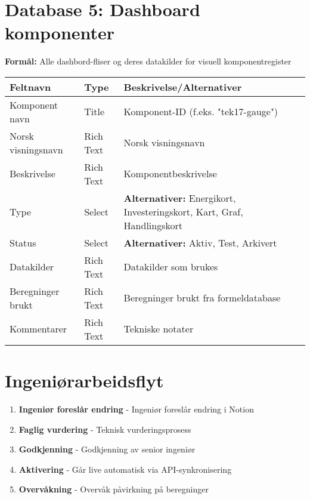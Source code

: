 \documentclass[11pt,a4paper]{article}
\begin{document}
\section{Database 5: Dashboard komponenter}

\textbf{Formål:} Alle dashbord-fliser og deres datakilder for visuell komponentregister

\begin{longtable}{@{}p{4cm}p{2.5cm}p{8cm}@{}}
\toprule
\textbf{Feltnavn} & \textbf{Type} & \textbf{Beskrivelse/Alternativer} \\
\midrule
Komponent navn & Title & Komponent-ID (f.eks. "tek17-gauge") \\
\addlinespace
Norsk visningsnavn & Rich Text & Norsk visningsnavn \\
\addlinespace
Beskrivelse & Rich Text & Komponentbeskrivelse \\
\addlinespace
Type & Select & \textbf{Alternativer:} Energikort, Investeringskort, Kart, Graf, Handlingskort \\
\addlinespace
Status & Select & \textbf{Alternativer:} Aktiv, Test, Arkivert \\
\addlinespace
Datakilder & Rich Text & Datakilder som brukes \\
\addlinespace
Beregninger brukt & Rich Text & Beregninger brukt fra formeldatabase \\
\addlinespace
Kommentarer & Rich Text & Tekniske notater \\
\bottomrule
\end{longtable}

\section{Ingeniørarbeidsflyt}

\begin{tcolorbox}[colback=secondarygreen!10,colframe=secondarygreen,title=Arbeidsflyt for endringer]
\begin{enumerate}[leftmargin=*]
    \item \textbf{Ingeniør foreslår endring} - Ingeniør foreslår endring i Notion
    \item \textbf{Faglig vurdering} - Teknisk vurderingsprosess
    \item \textbf{Godkjenning} - Godkjenning av senior ingeniør
    \item \textbf{Aktivering} - Går live automatisk via API-synkronisering
    \item \textbf{Overvåkning} - Overvåk påvirkning på beregninger
\end{enumerate}
\end{tcolorbox}
\end{document}
